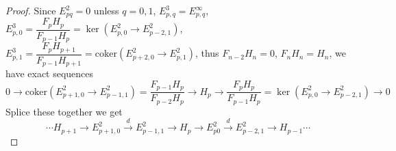 \documentclass[../main.tex]{subfiles}
\begin{document}
\begin{proof}
Since $E_{pq}^2=0$ unless $q=0,1$, $E^3_{p,q}=E^\infty_{p,q}$, $E^3_{p,0}=\dfrac{F_pH_p}{F_{p-1}H_p}=\ker(E^2_{p,0}\to E^2_{p-2,1})$, $E^3_{p,1}=\dfrac{F_pH_{p+1}}{F_{p-1}H_{p+1}}=\mathrm{coker}(E^2_{p+2,0}\to E^2_{p,1})$, thus $F_{n-2}H_n=0$, $F_nH_n=H_n$, we have exact sequences
\[0\to\mathrm{coker}(E^2_{p+1,0}\to E^2_{p-1,1})=\dfrac{F_{p-1}H_p}{F_{p-2}H_p}\to H_p\to\dfrac{F_pH_p}{F_{p-1}H_p}=\ker(E^2_{p,0}\to E^2_{p-2,1})\to0\]
Splice these together we get
\[\cdots H_{p+1}\to E^2_{p+1,0}\xrightarrow dE^2_{p-1,1}\to H_p\to E^2_{p0}\xrightarrow dE^2_{p-2,1}\to H_{p-1}\cdots\]
\end{proof}
\end{document}
